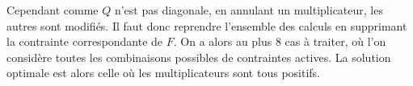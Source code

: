 Cependant comme $Q$ n'est pas diagonale, en annulant un multiplicateur, les autres sont modifiés.  Il faut donc reprendre l'ensemble des calculs en supprimant la contrainte correspondante de $F$. On a alors au plus 8 cas à traiter, où l'on considère toutes les combinaisons possibles de contraintes actives. La solution optimale est alors celle où les multiplicateurs sont tous positifs.





